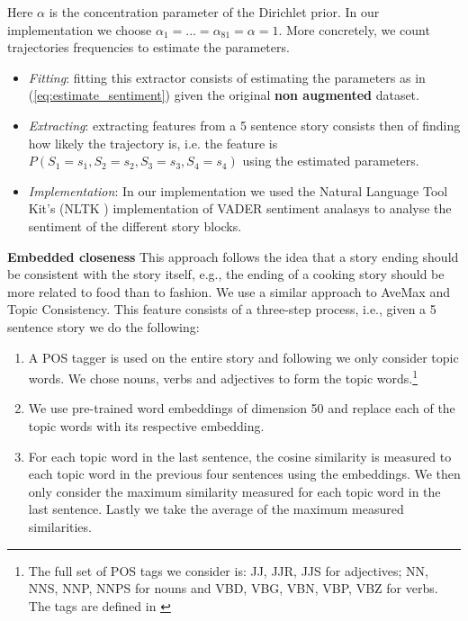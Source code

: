 \documentclass{article}
\begin{document}
Here $\alpha$ is the concentration parameter of the Dirichlet prior. In our
implementation we choose $\alpha_1 = ... = \alpha_{81} = \alpha = 1$.
More concretely, we count trajectories frequencies to estimate the parameters.

\begin{itemize}
	\item \textit{Fitting}: fitting this extractor consists of estimating the parameters as in (\ref{eq:estimate_sentiment}) given the original \textbf{non augmented} dataset.
	\item \textit{Extracting}: extracting features from a 5 sentence story consists then of finding how likely the trajectory is, i.e. the feature is $P(S_1 = s_1, S_2=s_2, S_3=s_3, S_4=s_4)$ using the estimated parameters.
	\item \textit{Implementation}: In our implementation we used the Natural Language Tool Kit's (NLTK \cite{NLTK_VADER}) implementation of VADER sentiment analasys \cite{VADER} to analyse the sentiment of the different story blocks.
\end{itemize}

\textbf{Embedded closeness} This approach follows the idea that a story ending
should be consistent with the story itself, e.g., the ending of a cooking story
should be more related to food than to fashion. We use a similar approach to
AveMax\cite{LSTMClassifier} and Topic Consistency\cite{COGCOMP}. This feature
consists of a three-step process, i.e., given a 5 sentence story we do the
following:

\begin{enumerate}

        \item A POS tagger is used on the entire story and following
            \cite{COGCOMP} we only consider topic words. We chose nouns,
            verbs and adjectives to form the topic words.\footnote{The full set
                of POS tags we consider is: JJ, JJR, JJS for adjectives; NN,
                NNS, NNP, NNPS for  nouns and VBD, VBG, VBN, VBP, VBZ for verbs.
                The tags are defined in \cite{TREEBANK}}

        \item We use pre-trained word embeddings of dimension 50 and replace
            each of the topic words with its respective embedding.

        \item For each topic word in the last sentence, the cosine similarity is
            measured to each topic word in the previous four sentences using
            the embeddings. We then only consider the maximum similarity
            measured for each topic word in the last sentence. Lastly we take
            the average of the maximum measured similarities.

\end{enumerate}
\end{document}
